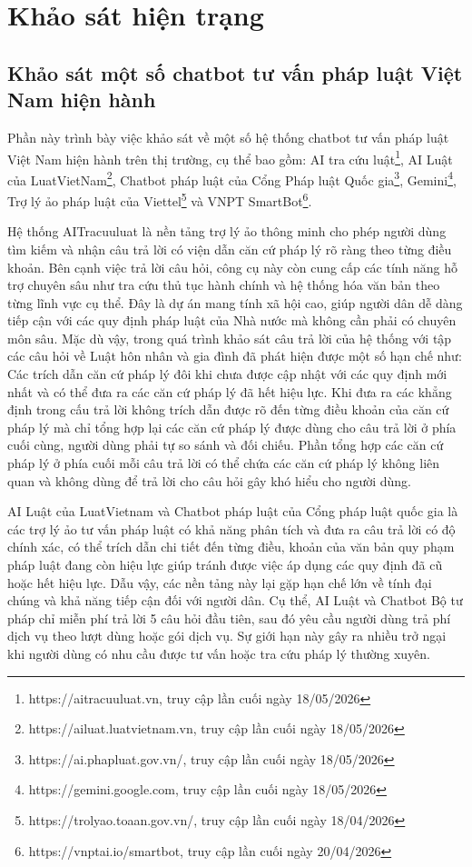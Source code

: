 \documentclass[../DoAn.tex]{subfiles}
\begin{document}
\section{Khảo sát hiện trạng}
\label{section:2.1}
\subsection{Khảo sát một số chatbot tư vấn pháp luật Việt Nam hiện hành}
Phần này trình bày việc khảo sát về một số hệ thống chatbot tư vấn pháp luật Việt Nam hiện hành trên thị trường, cụ thể bao gồm: AI tra cứu luật\footnote{https://aitracuuluat.vn, truy cập lần cuối ngày 18/05/2026}, AI Luật của LuatVietNam\footnote{https://ailuat.luatvietnam.vn, truy cập lần cuối ngày 18/05/2026}, Chatbot pháp luật của Cổng Pháp luật Quốc gia\footnote{https://ai.phapluat.gov.vn/, truy cập lần cuối ngày 18/05/2026}, Gemini\footnote{https://gemini.google.com, truy cập lần cuối ngày 18/05/2026}, Trợ lý ảo pháp luật của Viettel\footnote{https://trolyao.toaan.gov.vn/, truy cập lần cuối ngày 18/04/2026} và VNPT SmartBot\footnote{https://vnptai.io/smartbot, truy cập lần cuối ngày 20/04/2026}.

Hệ thống AITracuuluat là nền tảng trợ lý ảo thông minh cho phép người dùng tìm kiếm và nhận câu trả lời có viện dẫn căn cứ pháp lý rõ ràng theo từng điều khoản. Bên cạnh việc trả lời câu hỏi, công cụ này còn cung cấp các tính năng hỗ trợ chuyên sâu như tra cứu thủ tục hành chính và hệ thống hóa văn bản theo từng lĩnh vực cụ thể. Đây là dự án mang tính xã hội cao, giúp người dân dễ dàng tiếp cận với các quy định pháp luật của Nhà nước mà không cần phải có chuyên môn sâu. Mặc dù vậy, trong quá trình khảo sát câu trả lời của hệ thống với tập các câu hỏi về Luật hôn nhân và gia đình đã phát hiện được một số hạn chế như: Các trích dẫn căn cứ pháp lý đôi khi chưa được cập nhật với các quy định mới nhất và có thể đưa ra các căn cứ pháp lý đã hết hiệu lực. Khi đưa ra các khẳng định trong cấu trả lời không trích dẫn được rõ đến từng điều khoản của căn cứ pháp lý mà chỉ tổng hợp lại các căn cứ pháp lý được dùng cho câu trả lời ở phía cuối cùng, người dùng phải tự so sánh và đối chiếu. Phần tổng hợp các căn cứ pháp lý ở phía cuối mỗi câu trả lời có thể chứa các căn cứ pháp lý không liên quan và không dùng để trả lời cho câu hỏi gây khó hiểu cho người dùng. 

AI Luật của LuatVietnam và Chatbot pháp luật của Cổng pháp luật quốc gia là các trợ lý ảo tư vấn pháp luật có khả năng phân tích và đưa ra câu trả lời có độ chính xác, có thể trích dẫn chi tiết đến từng điều, khoản của văn bản quy phạm pháp luật đang còn hiệu lực giúp tránh được việc áp dụng các quy định đã cũ hoặc hết hiệu lực. Dẫu vậy, các nền tảng này lại gặp hạn chế lớn về tính đại chúng và khả năng tiếp cận đối với người dân. Cụ thể, AI Luật và Chatbot Bộ tư pháp chỉ miễn phí trả lời 5 câu hỏi đầu tiên, sau đó yêu cầu người dùng trả phí dịch vụ theo lượt dùng hoặc gói dịch vụ. Sự giới hạn này gây ra nhiều trở ngại khi người dùng có nhu cầu được tư vấn hoặc tra cứu pháp lý thường xuyên.
\end{document}
